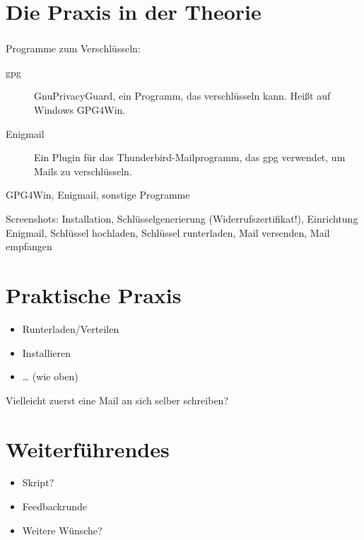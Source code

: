 \documentclass[compress]{beamer}
\begin{document}
\section{Die Praxis in der Theorie}
\label{sec-1-1-5}

\begin{frame}
  \frametitle{\insertsection}
  Programme zum Verschlüsseln:

  \begin{description}
  \item[gpg] \alert{G}nu\alert{P}rivacy\alert{G}uard, ein Programm,
    das verschlüsseln kann.  Heißt auf Windows \alert{GPG4Win}.
  \item[Enigmail] Ein Plugin für das Thunderbird-Mailprogramm, das gpg
    verwendet, um Mails zu verschlüsseln.
  \end{description}

\end{frame}

GPG4Win, Enigmail, sonstige Programme

Screenshots: Installation, Schlüsselgenerierung
(Widerrufszertifikat!), Einrichtung Enigmail, Schlüssel hochladen,
Schlüssel runterladen, Mail versenden, Mail empfangen
\section{Praktische Praxis}
\label{sec-1-1-6}

\begin{itemize}
\item Runterladen/Verteilen
\item Installieren
\item \ldots{} (wie oben)
\end{itemize}

Vielleicht zuerst eine Mail an sich selber schreiben?
\section{Weiterführendes}
\label{sec-1-1-7}

\begin{itemize}
\item Skript?
\item Feedbackrunde
\item Weitere Wünsche?
\end{itemize}
\end{document}
